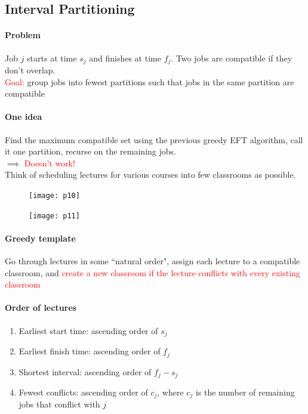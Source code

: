 \documentclass[11pt]{article}
\begin{document}
\subsection{Interval Partitioning}
\paragraph{Problem}
Job $j$ starts at time $s_j$ and finishes at time $f_j$. Two jobs are compatible if they don't overlap.\\
\textcolor{red}{Goal:} group jobs into fewest partitions such that jobs in the same partition are compatible

\paragraph{One idea}
Find the maximum compatible set using the previous greedy EFT algorithm, call it one partition, recurse on the remaining jobs. \\
$\implies$ \textcolor{red}{Doesn't work!} \\

\noindent Think of scheduling lectures for various courses into few classrooms as possible.

\begin{figure}[h]
	\centering
	\texttt{[image: p10]}
\end{figure}

\begin{figure}[h]
	\centering
	\texttt{[image: p11]}
\end{figure}

\paragraph{Greedy template}
Go through lectures in some ``natural order", assign each lecture to a compatible classroom, and \textcolor{red}{create a new classroom if the lecture conflicts with every existing classroom}

\paragraph{Order of lectures}
\begin{enumerate}
	\item Earliest start time: ascending order of $s_j$
	\item Earliest finish time: ascending order of $f_j$
	\item Shortest interval: ascending order of $f_j - s_j$
	\item Fewest conflicts: ascending order of $c_j$, where $c_j$ is the number of remaining jobs that conflict with $j$
\end{enumerate}
\end{document}
